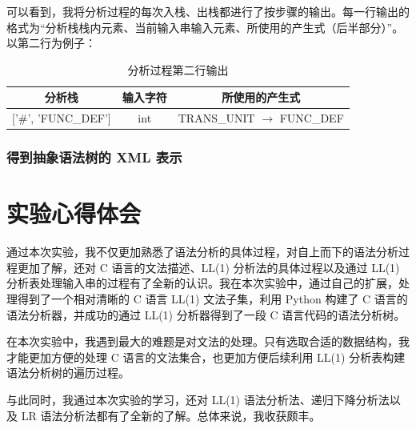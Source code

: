 \documentclass[UTF8]{ctexart}
\begin{document}
可以看到，我将分析过程的每次入栈、出栈都进行了按步骤的输出。每一行输出的格式为“分析栈栈内元素、当前输入串输入元素、所使用的产生式（后半部分）”。以第二行为例子：

\begin{table}[H]
  \centering
  \caption{分析过程第二行输出}
  \label{tab:parseoutput}
  \begin{tabular}{@{}c|c|c@{}}
  \toprule
  分析栈 & 输入字符 & 所使用的产生式 \\ \midrule
  {[}'\#', 'FUNC\_DEF'{]} & int & TRANS\_UNIT $\rightarrow$ FUNC\_DEF \\ \bottomrule
  \end{tabular}
\end{table}

\subsubsection{得到抽象语法树的 XML 表示}

\section{实验心得体会}
通过本次实验，我不仅更加熟悉了语法分析的具体过程，对自上而下的语法分析过程更加了解，还对 C 语言的文法描述、LL(1) 分析法的具体过程以及通过 LL(1) 分析表处理输入串的过程有了全新的认识。我在本次实验中，通过自己的扩展，处理得到了一个相对清晰的 C 语言 LL(1) 文法子集，利用 Python 构建了 C 语言的语法分析器，并成功的通过 LL(1) 分析器得到了一段 C 语言代码的语法分析树。

在本次实验中，我遇到最大的难题是对文法的处理。只有选取合适的数据结构，我才能更加方便的处理 C 语言的文法集合，也更加方便后续利用 LL(1) 分析表构建语法分析树的遍历过程。

与此同时，我通过本次实验的学习，还对 LL(1) 语法分析法、递归下降分析法以及 LR 语法分析法都有了全新的了解。总体来说，我收获颇丰。
\end{document}
